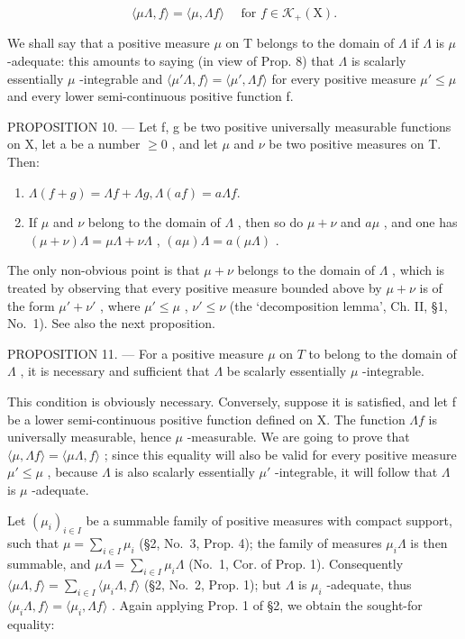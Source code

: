 \[
\langle \mu \Lambda , f \rangle = \langle \mu , \Lambda f \rangle \quad \text { for } f \in \mathscr {K} _ {+} (\mathrm{X}).
\]

We shall say that a positive measure \(\mu\) on T belongs to the domain of \(\Lambda\) if \(\Lambda\) is \(\mu\) -adequate: this amounts to saying (in view of Prop. 8) that \(\Lambda\) is scalarly essentially \(\mu\) -integrable and \(\langle\mu'\Lambda,f\rangle=\langle\mu',\Lambda f\rangle\) for every positive measure \(\mu'\leqslant\mu\) and every lower semi-continuous positive function f.

PROPOSITION 10. --- Let f, g be two positive universally measurable functions on X, let a be a number \(\geqslant 0\) , and let \(\mu\) and \(\nu\) be two positive measures on T. Then:

\begin{enumerate}
\def\labelenumi{\alph{enumi})}
\item
  \(\Lambda (f + g) = \Lambda f + \Lambda g, \Lambda (af) = a\Lambda f.\)
\item
  If \(\mu\) and \(\nu\) belong to the domain of \(\Lambda\) , then so do \(\mu + \nu\) and \(a\mu\) , and one has \((\mu + \nu)\Lambda = \mu \Lambda + \nu \Lambda\) , \((a\mu)\Lambda = a(\mu \Lambda)\) .
\end{enumerate}

The only non-obvious point is that \(\mu + \nu\) belongs to the domain of \(\Lambda\) , which is treated by observing that every positive measure bounded above by \(\mu + \nu\) is of the form \(\mu' + \nu'\) , where \(\mu' \leqslant \mu\) , \(\nu' \leqslant \nu\) (the `decomposition lemma', Ch. II, §1, No.~1). See also the next proposition.

PROPOSITION 11. --- For a positive measure \(\mu\) on \(T\) to belong to the domain of \(\Lambda\) , it is necessary and sufficient that \(\Lambda\) be scalarly essentially \(\mu\) -integrable.

This condition is obviously necessary. Conversely, suppose it is satisfied, and let f be a lower semi-continuous positive function defined on X. The function \(\Lambda f\) is universally measurable, hence \(\mu\) -measurable. We are going to prove that \(\langle\mu,\Lambda f\rangle=\langle\mu\Lambda,f\rangle\) ; since this equality will also be valid for every positive measure \(\mu'\leqslant\mu\) , because \(\Lambda\) is also scalarly essentially \(\mu'\) -integrable, it will follow that \(\Lambda\) is \(\mu\) -adequate.

Let \((\mu_i)_{i\in I}\) be a summable family of positive measures with compact support, such that \(\mu = \sum_{i\in I}\mu_i\) (§2, No.~3, Prop. 4); the family of measures \(\mu_{i}\Lambda\) is then summable, and \(\mu \Lambda = \sum_{i\in I}\mu_{i}\Lambda\) (No.~1, Cor. of Prop. 1). Consequently \(\langle \mu \Lambda ,f\rangle = \sum_{i\in I}\langle \mu_i\Lambda ,f\rangle\) (§2, No.~2, Prop. 1); but \(\Lambda\) is \(\mu_{i}\) -adequate, thus \(\langle \mu_i\Lambda ,f\rangle = \langle \mu_i,\Lambda f\rangle\) . Again applying Prop. 1 of §2, we obtain the sought-for equality:

